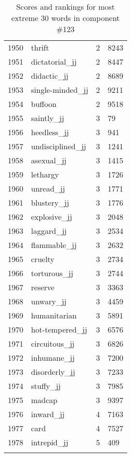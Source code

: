 \begin{longtable}[!htbp]{| rlr@{.}l |}
    1950 & thrift & 2 & 8243 \\
    1951 & dictatorial\_jj & 2 & 8447 \\
    1952 & didactic\_jj & 2 & 8689 \\
    1953 & single-minded\_jj & 2 & 9211 \\
    1954 & buffoon & 2 & 9518 \\
    1955 & saintly\_jj & 3 & 79 \\
    1956 & heedless\_jj & 3 & 941 \\
    1957 & undisciplined\_jj & 3 & 1241 \\
    1958 & asexual\_jj & 3 & 1415 \\
    1959 & lethargy & 3 & 1726 \\
    1960 & unread\_jj & 3 & 1771 \\
    1961 & blustery\_jj & 3 & 1776 \\
    1962 & explosive\_jj & 3 & 2048 \\
    1963 & laggard\_jj & 3 & 2534 \\
    1964 & flammable\_jj & 3 & 2632 \\
    1965 & cruelty & 3 & 2734 \\
    1966 & torturous\_jj & 3 & 2744 \\
    1967 & reserve & 3 & 3363 \\
    1968 & unwary\_jj & 3 & 4459 \\
    1969 & humanitarian & 3 & 5891 \\
    1970 & hot-tempered\_jj & 3 & 6576 \\
    1971 & circuitous\_jj & 3 & 6826 \\
    1972 & inhumane\_jj & 3 & 7200 \\
    1973 & disorderly\_jj & 3 & 7233 \\
    1974 & stuffy\_jj & 3 & 7985 \\
    1975 & madcap & 3 & 9397 \\
    1976 & inward\_jj & 4 & 7163 \\
    1977 & card & 4 & 7527 \\
    1978 & intrepid\_jj & 5 & 409 \\
    \hline
    \caption{Scores and rankings for most extreme 30 words in component \#123} \\
\end{longtable}
